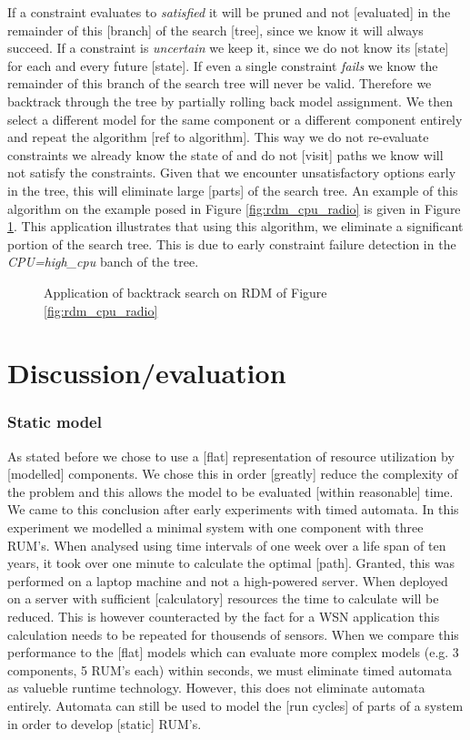 If a constraint evaluates to \emph{satisfied} it will be pruned and not [evaluated] in the remainder of this [branch] of the search [tree], since we know it will always succeed. If a constraint is \emph{uncertain} we keep it, since we do not know its [state] for each and every future [state]. If even a single constraint \emph{fails} we know the remainder of this branch of the search tree will never be valid. Therefore we backtrack through the tree by partially rolling back model assignment. We then select a different model for the same component or a different component entirely and repeat the algorithm [ref to algorithm]. This way we do not re-evaluate constraints we already know the state of and do not [visit] paths we know will not satisfy the constraints. Given that we encounter unsatisfactory options early in the tree, this will eliminate large [parts] of the search tree. An example of this algorithm on the example posed in Figure \ref{fig:rdm_cpu_radio} is given in Figure \ref{fig:search_cpu_radio}. This application illustrates that using this algorithm, we eliminate a significant portion of the search tree. This is due to early constraint failure detection in the \emph{CPU=high\_cpu} banch of the tree.
\begin{figure}

\label{fig:search_cpu_radio}
\caption{Application of backtrack search on RDM of Figure \ref{fig:rdm_cpu_radio}}
\end{figure}

\section{Discussion/evaluation}
\subsubsection{Static model}
As stated before we chose to use a [flat] representation of resource utilization by [modelled] components. We chose this in order [greatly] reduce the complexity of the problem and this allows the model to be evaluated [within reasonable] time. We came to this conclusion after early experiments with timed automata. In this experiment we modelled a minimal system with one component with three RUM's. When analysed using time intervals of one week over a life span of ten years, it took over one minute to calculate the optimal [path]. Granted, this was performed on a laptop machine and not a high-powered server. When deployed on a server with sufficient [calculatory] resources the time to calculate will be reduced. This is however counteracted by the fact for a WSN application this calculation needs to be repeated for thousends of sensors. When we compare this performance to the [flat] models which can evaluate more complex models (e.g. 3 components, 5 RUM's each) within seconds, we must eliminate timed automata as valueble runtime technology. However, this does not eliminate automata entirely. Automata can still be used to model the [run cycles] of parts of a system in order to develop [static] RUM's.

